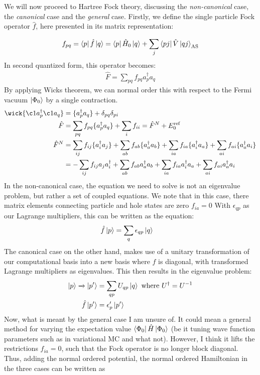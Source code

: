 \documentclass{article}
\newcommand{\crt}[1]{a_{#1}^{\dagger}}
\newcommand{\ani}[1]{a_{#1}}
\newcommand{\gs}{\ket{\Phi_0}}
\newcommand{\inner}[3]{\bra{#1}#2\ket{#3}}
\newcommand{\innerAS}[3]{\inner{#1}{#2}{#3}_{\text{AS}}}
\newcommand{\set}[1]{\{ #1 \}}
\newcommand{\energyref}{E_0^{\text{ref}}}
\begin{document}
    We will now proceed to Hartree Fock theory, discussing the \textit{non-canonical} case, the \textit{canonical} case and the \textit{general} case. Firstly, we define the single particle Fock operator $\hat{f}$, here presented in its matrix representation:  

    \begin{align*}
        f_{pq} = \inner{p}{\hat{f}}{q} = \inner{p}{\hat{H}_0}{q} + \sum_j \innerAS{pj}{\hat{V}}{qj}
    \end{align*}
    In second quantized form, this operator becomes:
    \begin{align*}
        \hat{F} = \sum_{pq} f_{pq}\crt{p}\ani{q}
    \end{align*}
    By applying Wicks theorem, we can normal order this with respect to the Fermi vacuum $\gs$ by a single contraction.
    \begin{align*}
        \wick{\c1{a}_p^\dagger \c1{a}_q} &= \set{\crt{p}\ani{q}} + \delta_{pq}\delta_{pi} \\
        \hat{F} &= \sum_{pq} f_{pq}\set{\crt{p}\ani{q}} + \sum_i f_{ii} = \hat{F}^N + \energyref \\
        \hat{F}^N &= \sum_{ij} f_{ij}\set{\crt{i}\ani{j}} + \sum_{ab} f_{ab}\set{\crt{a}\ani{b}} + \sum_{ia}f_{ia} \set{\crt{i}\ani{a}} + \sum_{ai} f_{ai}\set{\crt{a}\ani{i}} \\
        &= -\sum_{ij} f_{ij}\ani{j}\crt{i} + \sum_{ab} f_{ab} \crt{a}\ani{b} + \sum_{ia} f_{ia}\crt{i}\ani{a} + \sum_{ai} f_{ai} \crt{a}\ani{i}
    \end{align*} 
    In the non-canonical case, the equation we need to solve is not an eigenvalue problem, but rather a set of coupled equations. We note that in this case, there matrix elements connecting particle and hole states are zero $f_{ia} = 0$ With $\epsilon_{qp}$ as our Lagrange multipliers, this can be written as the equation:   
    \begin{align*}
        \hat{f}\ket{p} &= \sum_{q} \epsilon_{qp} \ket{q}
    \end{align*}
    The canonical case on the other hand, makes use of a unitary transformation of our computational basis into a new basis where $f$ is diagonal, with transformed Lagrange multipliers as eigenvalues. This then results in the eigenvalue problem:
    \begin{align*}
        \ket{p} \xrightarrow{} \ket{p'} &= \sum_{qp} U_{qp} \ket{q} \text{    where   } U^\dagger = U^{-1}\\
        \hat{f}\ket{p'} &= \epsilon_p' \ket{p'}
    \end{align*}
    Now, what is meant by the general case I am unsure of. It could mean a general method for varying the expectation value $\inner{\Phi_0}{\hat{H}}{\Phi_0}$ (be it tuning wave function parameters such as in variational MC and what not). However, I think it lifts the restrictions $f_{ia} = 0$, such that the Fock operator is no longer block diagonal. Thus, adding the normal ordered potential, the normal ordered Hamiltonian in the three cases can be written as 
    
\end{document}
